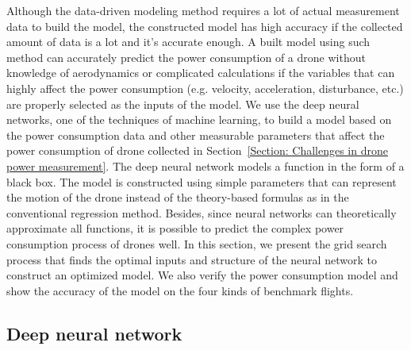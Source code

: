 \documentclass[journal]{./template/IEEEtran}
\begin{document}
Although the data-driven modeling method requires a lot of actual measurement data to build the model, the constructed model has high accuracy if the collected amount of data is a lot and it's accurate enough.
A built model using such method can accurately predict the power consumption of a drone without knowledge of aerodynamics or complicated calculations if the variables that can highly affect the power consumption (e.g. velocity, acceleration, disturbance, etc.) are properly selected as the inputs of the model.
We use the deep neural networks, one of the techniques of machine learning, to build a model based on the power consumption data and other measurable parameters that affect the power consumption of drone collected in Section~\ref{Section: Challenges in drone power measurement}.
The deep neural network models a function in the form of a black box. The model is constructed using simple parameters that can represent the motion of the drone instead of the theory-based formulas as in the conventional regression method. 
Besides, since neural networks can theoretically approximate all functions, it is possible to predict the complex power consumption process of drones well.
In this section, we present the grid search process that finds the optimal inputs and structure of the neural network to construct an optimized model. 
We also verify the power consumption model and show the accuracy of the model on the four kinds of benchmark flights.





\subsection{Deep neural network}
\end{document}
